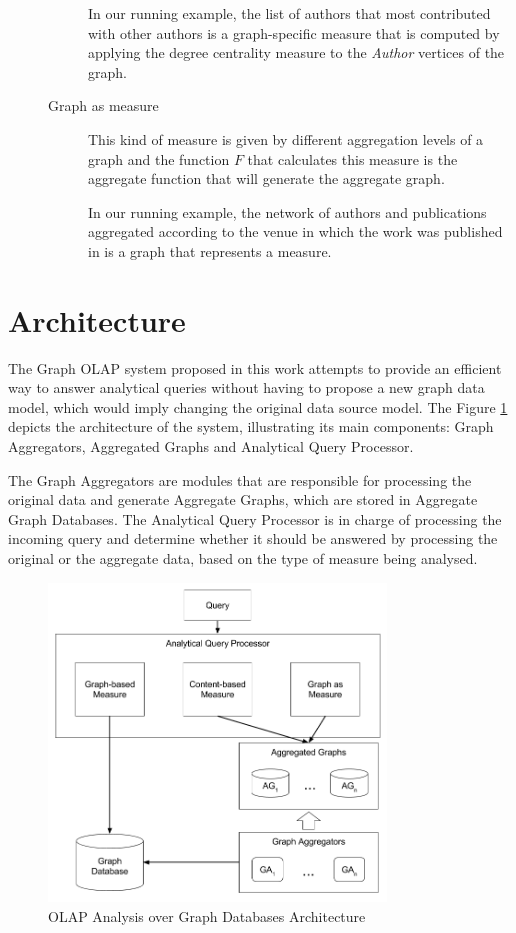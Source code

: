 \begin{description}
\begin{description}
In our running example, the list of authors that most contributed with other authors is a graph-specific measure that is computed by applying the degree centrality measure to the \emph{Author} vertices of the graph.
\item[Graph as measure] This kind of measure is given by different aggregation levels of a graph and the function $F$ that calculates this measure is the aggregate function that will generate the aggregate graph. 

In our running example, the network of authors and  publications aggregated according to the venue in which the work was published in is a graph that represents a measure.
\end{description}
\end{description}

\section{Architecture}

The Graph OLAP system proposed in this work attempts to provide an efficient way to answer analytical queries without having to propose a new graph data model, which would imply changing the original data source model. The Figure \ref{fig:figure27} depicts the architecture of the system, illustrating its main components: Graph Aggregators, Aggregated Graphs and Analytical Query Processor.

The Graph Aggregators are modules that are responsible for processing the original data and generate Aggregate Graphs, which are stored in Aggregate Graph Databases. The Analytical Query Processor is in charge of processing the incoming query and determine whether it should be answered by processing the original or the aggregate data, based on the type of measure being analysed.

\begin{figure}[ht]
\centering
\includegraphics[width=0.8\textwidth]{../Architecture.png}
\caption{OLAP Analysis over Graph Databases Architecture}
\label{fig:figure27}
\end{figure}

